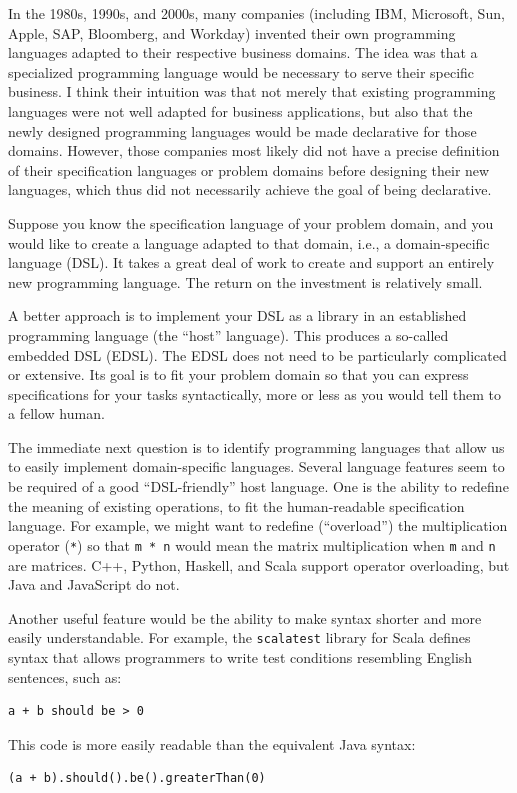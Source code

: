 
In the 1980s, 1990s, and 2000s, many companies (including IBM, Microsoft,
Sun, Apple, SAP, Bloomberg, and Workday) invented their own programming
languages adapted to their respective business domains. The idea was
that a specialized programming language would be necessary to serve
their specific business. I think their intuition was that not merely
that existing programming languages were not well adapted for business
applications, but also that the newly designed programming languages
would be made declarative for those domains. However, those companies
most likely did not have a precise definition of their specification
languages or problem domains before designing their new languages,
which thus did not necessarily achieve the goal of being declarative.

Suppose you know the specification language of your problem domain,
and you would like to create a language adapted to that domain, i.e.,
a domain-specific language (DSL). It takes a great deal of work to
create and support an entirely new programming language. The return
on the investment is relatively small.

A better approach is to implement your DSL as a library in an established
programming language (the \textsf{``}host\textsf{''} language). This produces a so-called
embedded DSL (EDSL). The EDSL does not need to be particularly complicated
or extensive. Its goal is to fit your problem domain so that you can
express specifications for your tasks syntactically, more or less
as you would tell them to a fellow human.

The immediate next question is to identify programming languages that
allow us to easily implement domain-specific languages. Several language
features seem to be required of a good \textsf{``}DSL-friendly\textsf{''} host language.
One is the ability to redefine the meaning of existing operations,
to fit the human-readable specification language. For example, we
might want to redefine (\textsf{``}overload\textsf{''}) the multiplication operator
(\lstinline!*!) so that \lstinline!m * n! would mean the matrix
multiplication when \lstinline!m! and \lstinline!n! are matrices.
C++, Python, Haskell, and Scala support operator overloading, but
Java and JavaScript do not.

Another useful feature would be the ability to make syntax shorter
and more easily understandable. For example, the \lstinline!scalatest!
library for Scala defines syntax that allows programmers to write
test conditions resembling English sentences, such as:
\begin{lstlisting}
a + b should be > 0
\end{lstlisting}
This code is more easily readable than the equivalent Java syntax:
\begin{lstlisting}
(a + b).should().be().greaterThan(0)
\end{lstlisting}

